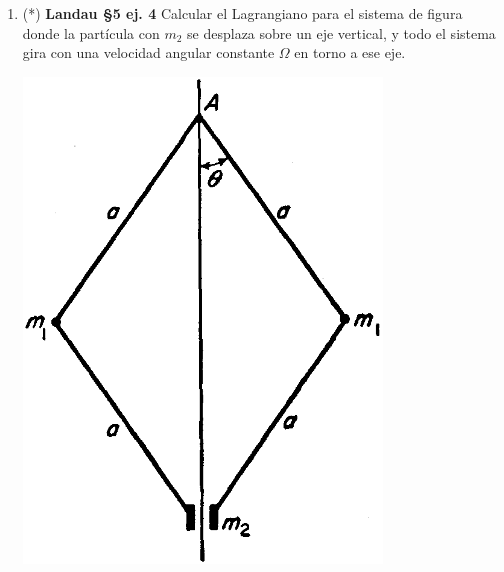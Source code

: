 \documentclass[11pt,spanish,a4paper]{article}
\begin{document}
\begin{enumerate}
\item \begin{minipage}[t][4.5cm]{0.7\textwidth}
(*) \textbf{Landau \S5 ej. 4}
	Calcular el Lagrangiano para el sistema de figura donde la partícula con \(m_2\) se desplaza sobre un eje vertical, y todo el sistema gira con una velocidad angular constante \(\Omega\) en torno a ese eje.
\end{minipage}
	\begin{minipage}[c][2.5cm][t]{0.3\textwidth}
	\includegraphics[width=0.75\textwidth]{landauS52_fig4.png}
\end{minipage}



\end{enumerate}
\end{document}
